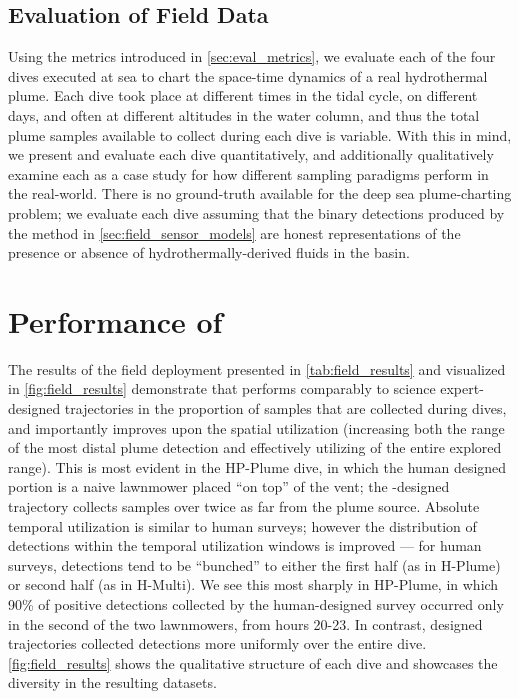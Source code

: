 \subsection{Evaluation of Field Data}
\label{sec:field_eval_metrics}
Using the metrics introduced in \cref{sec:eval_metrics}, we evaluate each of the four dives executed at sea to chart the space-time dynamics of a real hydrothermal plume. Each dive took place at different times in the tidal cycle, on different days, and often at different altitudes in the water column, and thus the total plume samples available to collect during each dive is variable. With this in mind, we present and evaluate each dive quantitatively, and additionally qualitatively examine each as a case study for how different sampling paradigms perform in the real-world. There is no ground-truth available for the deep sea plume-charting problem; we evaluate each \Sentry dive assuming that the binary detections produced by the method in \cref{sec:field_sensor_models} are honest representations of the presence or absence of hydrothermally-derived fluids in the basin. 

\section{Performance of \PHORTEX}
\label{sec:phortex_performance}
The results of the field deployment presented in \cref{tab:field_results} and visualized in \cref{fig:field_results} demonstrate that \PHORTEX performs comparably to science expert-designed trajectories in the proportion of samples that are collected during dives, and importantly improves upon the spatial utilization (increasing both the range of the most distal plume detection and effectively utilizing of the entire explored range). This is most evident in the HP-Plume dive, in which the human designed portion is a naive lawnmower placed ``on top'' of the vent; the \PHORTEX-designed trajectory collects samples over twice as far from the plume source. Absolute temporal utilization is similar to human surveys; however the distribution of detections within the temporal utilization windows is improved --- for human surveys, detections tend to be ``bunched'' to either the first half (as in H-Plume) or second half (as in H-Multi). We see this most sharply in HP-Plume, in which 90\% of positive detections collected by the human-designed survey occurred only in the second of the two lawnmowers, from hours 20-23. In contrast, \PHORTEX designed trajectories collected detections more uniformly over the entire dive. \cref{fig:field_results} shows the qualitative structure of each dive and showcases the diversity in the resulting datasets.


